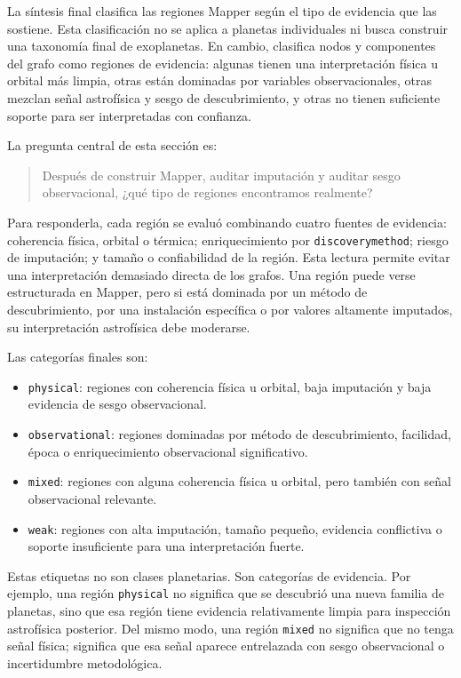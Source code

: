 La síntesis final clasifica las regiones Mapper según el tipo de evidencia que las sostiene. Esta clasificación no se aplica a planetas individuales ni busca construir una taxonomía final de exoplanetas. En cambio, clasifica nodos y componentes del grafo como regiones de evidencia: algunas tienen una interpretación física u orbital más limpia, otras están dominadas por variables observacionales, otras mezclan señal astrofísica y sesgo de descubrimiento, y otras no tienen suficiente soporte para ser interpretadas con confianza.

La pregunta central de esta sección es:

\begin{quote}
Después de construir Mapper, auditar imputación y auditar sesgo observacional, ¿qué tipo de regiones encontramos realmente?
\end{quote}

Para responderla, cada región se evaluó combinando cuatro fuentes de evidencia: coherencia física, orbital o térmica; enriquecimiento por \texttt{discoverymethod}; riesgo de imputación; y tamaño o confiabilidad de la región. Esta lectura permite evitar una interpretación demasiado directa de los grafos. Una región puede verse estructurada en Mapper, pero si está dominada por un método de descubrimiento, por una instalación específica o por valores altamente imputados, su interpretación astrofísica debe moderarse.

Las categorías finales son:

\begin{itemize}
    \item \texttt{physical}: regiones con coherencia física u orbital, baja imputación y baja evidencia de sesgo observacional.
    \item \texttt{observational}: regiones dominadas por método de descubrimiento, facilidad, época o enriquecimiento observacional significativo.
    \item \texttt{mixed}: regiones con alguna coherencia física u orbital, pero también con señal observacional relevante.
    \item \texttt{weak}: regiones con alta imputación, tamaño pequeño, evidencia conflictiva o soporte insuficiente para una interpretación fuerte.
\end{itemize}

Estas etiquetas no son clases planetarias. Son categorías de evidencia. Por ejemplo, una región \texttt{physical} no significa que se descubrió una nueva familia de planetas, sino que esa región tiene evidencia relativamente limpia para inspección astrofísica posterior. Del mismo modo, una región \texttt{mixed} no significa que no tenga señal física; significa que esa señal aparece entrelazada con sesgo observacional o incertidumbre metodológica.

